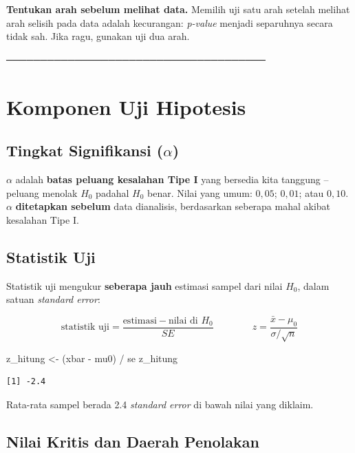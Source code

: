 \documentclass[
  indonesian,
  letterpaper,
]{book}
\newenvironment{Shaded}{\begin{snugshade}}{\end{snugshade}}
\newcommand{\NormalTok}[1]{\textcolor[rgb]{0.00,0.23,0.31}{#1}}
\newcommand{\OtherTok}[1]{\textcolor[rgb]{0.00,0.23,0.31}{#1}}
\newcommand{\SpecialCharTok}[1]{\textcolor[rgb]{0.37,0.37,0.37}{#1}}
\begin{document}
\textbf{Tentukan arah sebelum melihat data.} Memilih uji satu arah
setelah melihat arah selisih pada data adalah kecurangan: \emph{p-value}
menjadi separuhnya secara tidak sah. Jika ragu, gunakan uji dua arah.

──────────────────────────────────────

\section{Komponen Uji Hipotesis}\label{komponen-uji-hipotesis}

\subsection{\texorpdfstring{Tingkat Signifikansi
(\(\alpha\))}{Tingkat Signifikansi (\textbackslash alpha)}}\label{tingkat-signifikansi-alpha}

\(\alpha\) adalah \textbf{batas peluang kesalahan Tipe I} yang bersedia
kita tanggung -- peluang menolak \(H_0\) padahal \(H_0\) benar. Nilai
yang umum: \(0{,}05\); \(0{,}01\); atau \(0{,}10\). \(\alpha\)
\textbf{ditetapkan sebelum} data dianalisis, berdasarkan seberapa mahal
akibat kesalahan Tipe I.

\subsection{Statistik Uji}\label{statistik-uji}

Statistik uji mengukur \textbf{seberapa jauh} estimasi sampel dari nilai
\(H_0\), dalam satuan \emph{standard error}:

\[\text{statistik uji} = \frac{\text{estimasi} - \text{nilai di } H_0}{SE} \qquad\qquad z = \frac{\bar{x} - \mu_0}{\sigma/\sqrt{n}}\]

\begin{Shaded}
\begin{Highlighting}[]
\NormalTok{z\_hitung }\OtherTok{\textless{}{-}}\NormalTok{ (xbar }\SpecialCharTok{{-}}\NormalTok{ mu0) }\SpecialCharTok{/}\NormalTok{ se}
\NormalTok{z\_hitung}
\end{Highlighting}
\end{Shaded}

\begin{verbatim}
[1] -2.4
\end{verbatim}

Rata-rata sampel berada 2.4 \emph{standard error} di bawah nilai yang
diklaim.

\subsection{Nilai Kritis dan Daerah
Penolakan}\label{nilai-kritis-dan-daerah-penolakan}
\end{document}
